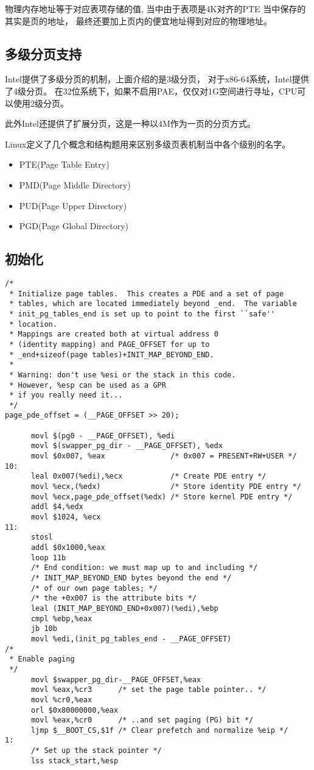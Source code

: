物理内存地址等于对应表项存储的值, 当中由于表项是4K对齐的PTE 当中保存的其实是页的地址， 最终还要加上页内的便宜地址得到对应的物理地址。

\subsection{多级分页支持}

Intel提供了多级分页的机制，上面介绍的是3级分页， 对于x86-64系统，Intel提供了4级分页。
在32位系统下，如果不启用PAE，仅仅对1G空间进行寻址，CPU可以使用2级分页。

此外Intel还提供了扩展分页，这是一种以4M作为一页的分页方式。

Linux定义了几个概念和结构题用来区别多级页表机制当中各个级别的名字。
\begin{itemize}
  \item PTE(Page Table Entry)
  \item PMD(Page Middle Directory)
  \item PUD(Page Upper Directory)
  \item PGD(Page Global Directory)
\end{itemize}

\subsection{初始化}

\begin{lstlisting}
/*
 * Initialize page tables.  This creates a PDE and a set of page
 * tables, which are located immediately beyond _end.  The variable
 * init_pg_tables_end is set up to point to the first ``safe'' 
 * location.
 * Mappings are created both at virtual address 0 
 * (identity mapping) and PAGE_OFFSET for up to 
 * _end+sizeof(page tables)+INIT_MAP_BEYOND_END.
 *
 * Warning: don't use %esi or the stack in this code. 
 * However, %esp can be used as a GPR 
 * if you really need it...
 */
page_pde_offset = (__PAGE_OFFSET >> 20);

      movl $(pg0 - __PAGE_OFFSET), %edi
      movl $(swapper_pg_dir - __PAGE_OFFSET), %edx
      movl $0x007, %eax               /* 0x007 = PRESENT+RW+USER */
10:
      leal 0x007(%edi),%ecx           /* Create PDE entry */
      movl %ecx,(%edx)                /* Store identity PDE entry */
      movl %ecx,page_pde_offset(%edx) /* Store kernel PDE entry */
      addl $4,%edx
      movl $1024, %ecx
11:
      stosl
      addl $0x1000,%eax
      loop 11b
      /* End condition: we must map up to and including */
      /* INIT_MAP_BEYOND_END bytes beyond the end */
      /* of our own page tables; */
      /* the +0x007 is the attribute bits */
      leal (INIT_MAP_BEYOND_END+0x007)(%edi),%ebp
      cmpl %ebp,%eax
      jb 10b
      movl %edi,(init_pg_tables_end - __PAGE_OFFSET)
/*
 * Enable paging
 */
      movl $swapper_pg_dir-__PAGE_OFFSET,%eax
      movl %eax,%cr3      /* set the page table pointer.. */
      movl %cr0,%eax
      orl $0x80000000,%eax
      movl %eax,%cr0      /* ..and set paging (PG) bit */
      ljmp $__BOOT_CS,$1f /* Clear prefetch and normalize %eip */
1:
      /* Set up the stack pointer */
      lss stack_start,%esp
\end{lstlisting}

